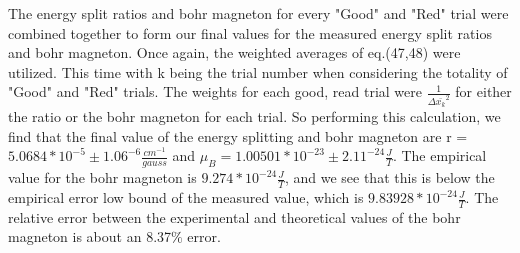 \documentclass{article}
\begin{document}
    The energy split ratios and bohr magneton for every "Good" and "Red" trial were combined together to form our final values for the measured energy split ratios and bohr magneton. Once again, the weighted averages of eq.(47,48) were utilized. This time with k being the trial number when considering the totality of "Good" and "Red" trials. The weights for each good, read trial were $\frac{1}{\Delta \bar{x_k}^2}$ for either the ratio or the bohr magneton for each trial. So performing this calculation, we find that the final value of the energy splitting and bohr magneton are 
    r = $5.0684*10^{-5} \pm 1.06^{-6} \frac{cm^{-1}}{gauss}$ and $\mu_B = 1.00501*10^{-23} \pm 2.11^{-24} \frac{J}{T}$. 
    The empirical value for the bohr magneton is $9.274*10^{-24} \frac{J}{T}$, and we see that this is below the empirical error low bound of the measured value, which is $9.83928*10^{-24} \frac{J}{T}$. The relative error between the experimental and theoretical values of the bohr magneton is about an 8.37$\%$ error.
    
\end{document}
